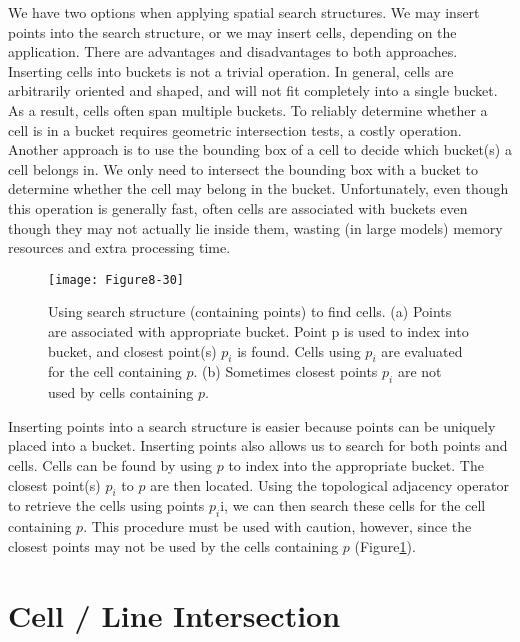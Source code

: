 We have two options when applying spatial search structures. We may insert points into the search structure, or we may insert cells, depending on the application. There are advantages and disadvantages to both approaches. Inserting cells into buckets is not a trivial operation. In general, cells are arbitrarily oriented and shaped, and will not fit completely into a single bucket. As a result, cells often span multiple buckets. To reliably determine whether a cell is in a bucket requires geometric intersection tests, a costly operation. Another approach is to use the bounding box of a cell to decide which bucket(s) a cell belongs in. We only need to intersect the bounding box with a bucket to determine whether the cell may belong in the bucket. Unfortunately, even though this operation is generally fast, often cells are associated with buckets even though they may not actually lie inside them, wasting (in large models) memory resources and extra processing time.

\begin{figure}[!htb]
    \centering
    \texttt{[image: Figure8-30]}\\
    \caption{Using search structure (containing points) to find cells. (a) Points are associated with appropriate bucket. Point p is used to index into bucket, and closest point(s) $p_i$ is found. Cells using $p_i$ are evaluated for the cell containing $p$. (b) Sometimes closest points $p_i$ are not used by cells containing $p$.}\label{fig:Figure8-30}
\end{figure}

Inserting points into a search structure is easier because points can be uniquely placed into a bucket. Inserting points also allows us to search for both points and cells. Cells can be found by using $p$ to index into the appropriate bucket. The closest point(s) $p_i$ to $p$ are then located. Using the topological adjacency operator to retrieve the cells using points $p_i$i, we can then search these cells for the cell containing $p$. This procedure must be used with caution, however, since the closest points may not be used by the cells containing $p$ (Figure\ref{fig:Figure8-30}).

\section{Cell / Line Intersection}

